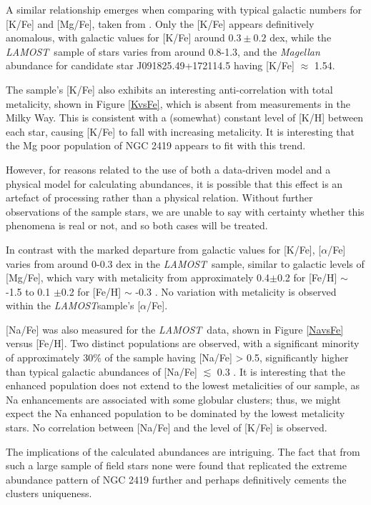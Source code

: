\documentclass[a4paper,fleqn,usenatbib]{mnras}
\newcommand{\project}[1]{\emph{#1}}
\newcommand{\lamost}{\project{LAMOST}}
\begin{document}
A similar relationship emerges when comparing with typical galactic numbers for [K/Fe] and [Mg/Fe], taken from \cite{kobayashi2011}.
Only the [K/Fe] appears definitively anomalous, with galactic values for [K/Fe] around $0.3 \pm 0.2$ dex, while the \lamost \ sample of stars varies from around 0.8-1.3, and the \textit{Magellan} abundance for candidate star J091825.49+172114.5 having [K/Fe] $\approx$ 1.54.

The sample's [K/Fe] also exhibits an interesting anti-correlation with total metalicity, shown in Figure \ref{KvsFe}, which is absent from measurements in the Milky Way. This is consistent with a (somewhat) constant level of [K/H] between each star, causing [K/Fe] to fall with increasing metalicity. It is interesting that the Mg poor population of NGC 2419 appears to fit with this trend.

 However, for reasons related to the use of both a data-driven model and a physical model for calculating abundances, it is possible that this effect is an artefact of processing rather than a physical relation. Without further observations of the sample stars, we are unable to say with certainty whether this phenomena is real or not, and so both cases will be treated.

In contrast with the marked departure from galactic values for [K/Fe], [$\alpha$/Fe] varies from around 0-0.3 dex in the \lamost \ sample, similar to galactic levels of [Mg/Fe], which vary with metalicity from approximately 0.4$\pm$0.2 for [Fe/H] $\sim$ -1.5 to 0.1 $\pm$0.2 for [Fe/H] $\sim$ -0.3 \citep{kobayashi2011}. No variation with metalicity is observed within the \lamost sample's [$\alpha$/Fe].

[Na/Fe] was also measured for the \lamost\ data, shown in Figure \ref{NavsFe} versus [Fe/H]. Two distinct populations are observed, with a significant minority of approximately 30\% of the sample having [Na/Fe] > 0.5, significantly higher than typical galactic abundances of [Na/Fe] $\lesssim$ 0.3 \citep{kobayashi2011}. It is interesting that the enhanced population does not extend to the lowest metalicities of our sample, as Na enhancements are associated with some globular clusters; thus, we might expect the Na enhanced population to be dominated by the lowest metalicity stars. No correlation between [Na/Fe] and the level of [K/Fe] is observed.

The implications of the calculated abundances are intriguing. The fact that from such a large sample of field stars none were found that replicated the extreme abundance pattern of NGC 2419 further and perhaps definitively cements the clusters uniqueness.
\end{document}
